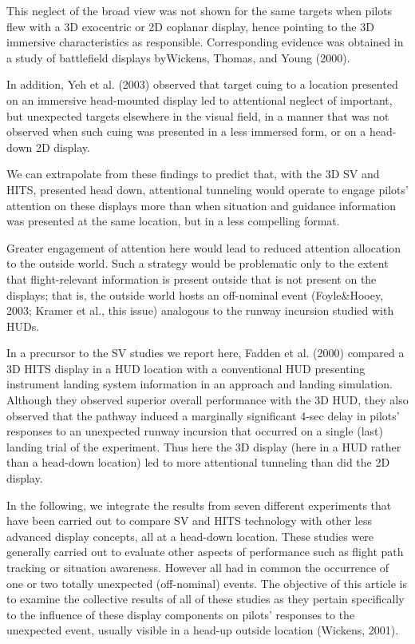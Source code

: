 \documentclass[utf8,bachelor,manualbib]{gradu3}
\begin{document}
This neglect of the broad view was not shown for the same targets when pilots flew with a 3D exocentric or 2D coplanar display, hence pointing to the 3D immersive characteristics as responsible. Corresponding evidence was obtained in a study of battlefield displays byWickens, Thomas, and Young (2000).

In addition, Yeh et al. (2003) observed that target cuing to a location presented on an immersive head-mounted display led to attentional neglect of important, but unexpected targets elsewhere in the visual field, in a manner that was not observed when such cuing was presented in a less immersed form, or on a head-down 2D display.

We can extrapolate from these findings to predict that, with the 3D SV and HITS, presented head down, attentional tunneling would operate to engage pilots’
attention on these displays more than when situation and guidance information was presented at the same location, but in a less compelling format.

Greater engagement of attention here would lead to reduced attention allocation to the outside world. Such a strategy would be problematic only to the extent that flight-relevant information is present outside that is not present on the displays; that is, the outside world hosts an off-nominal event (Foyle\&Hooey, 2003; Kramer et al., this
issue) analogous to the runway incursion studied with HUDs.

In a precursor to the SV studies we report here, Fadden et al. (2000) compared a 3D HITS display in a HUD location with a conventional HUD presenting instrument landing system information in an approach and landing simulation. Although they observed superior overall performance with the 3D HUD, they also observed that the pathway induced a marginally significant 4-sec delay in pilots’ responses to an unexpected runway incursion that occurred on a single (last) landing trial of the experiment. Thus here the 3D display (here in a HUD rather than a head-down location) led to more attentional tunneling than did the 2D display.






In the following, we integrate the results from seven different experiments that
have been carried out to compare SV and HITS technology with other less advanced
display concepts, all at a head-down location. These studies were generally
carried out to evaluate other aspects of performance such as flight path tracking or
situation awareness. However all had in common the occurrence of one or two totally
unexpected (off-nominal) events. The objective of this article is to examine
the collective results of all of these studies as they pertain specifically to the influence of these display components on pilots’ responses to the unexpected event,
usually visible in a head-up outside location (Wickens, 2001).
\end{document}
